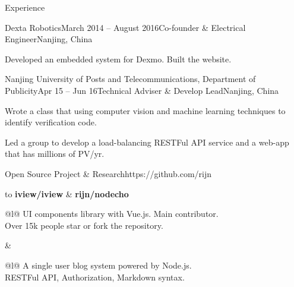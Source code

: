 \documentclass{resume} %
\begin{document}
\begin{rSection}{Experience}

\begin{rSubsection}{Dexta Robotics}{March 2014 -- August 2016}{Co-founder \& Electrical Engineer}{Nanjing, China}

\item Developed an embedded system for Dexmo. Built the website.

\end{rSubsection}


\begin{rSubsection}{Nanjing University of Posts and Telecommunications, Department of Publicity}{Apr 15 -- Jun 16}{Technical Adviser \& Develop Lead}{Nanjing, China}
\item Wrote a class that using computer vision and machine learning techniques to identify verification code.
\item Led a group to develop a load-balancing RESTFul API service and a web-app that has millions of PV/yr.
\end{rSubsection}

\end{rSection}


\begin{rSection}{Open Source Project \& Research}{https://github.com/rijn}

\begin{tabu} to 
{\bf iview/iview} & {\bf rijn/nodecho}\\
\begin{tabu}{@{}l@{}}
	UI components library with Vue.js. Main contributor. \\
	Over 15k people star or fork the repository.
\end{tabu}
&
\begin{tabu}{@{}l@{}}
	A single user blog system powered by Node.js.\\
	RESTFul API, Authorization, Markdown syntax.\\
\end{tabu}\\
\end{tabu}

\end{rSection}
\end{document}
